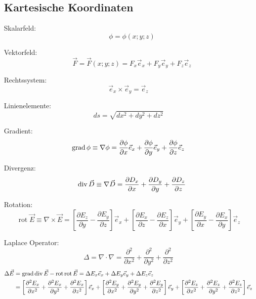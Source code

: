 \subsection{Kartesische Koordinaten}
\begin{description}
      \item Skalarfeld:
            \[
                  \quad \phi = \phi(x;y;z)
            \]
      \item Vektorfeld:
            \[
                  \quad \vec{F} = \vec{F}(x;y;z) = F_x\vec{e}_x+F_y\vec{e}_y+F_z\vec{e}_z
            \]
      \item Rechtssystem:
            \[
                  \vec{e}_x \times \vec{e}_y=\vec{e}_z
            \]
      \item Linienelemente:
            \[
                  ds=\sqrt{d x^{2}+d y^{2}+d z^{2}}
            \]
      \item Gradient:
            \[
                  \operatorname{grad} \phi \equiv \nabla \phi=\frac{\partial \phi}{\partial x} \vec{e}_x+\frac{\partial \phi}{\partial y} \vec{e}_y+\frac{\partial \phi}{\partial z} \vec{e}_z
            \]
      \item Divergenz:
            \[
                  \quad \operatorname{div} \vec{D} \equiv \nabla \vec{D}=\frac{\partial D_{x}}{\partial x}+\frac{\partial D_{y}}{\partial y}+\frac{\partial D_{z}}{\partial z}
            \]
      \item Rotation:
            \[
                  \operatorname{rot} \vec{E} \equiv \nabla \times \vec{E} =
                  \left[\frac{\partial E_z}{\partial y}-\frac{\partial E_y}{\partial z}\right] \vec{e}_x+\left[\frac{\partial E_x}{\partial z}-\frac{\partial E_z}{\partial x}\right] \vec{e}_y+\left[\frac{\partial E_y}{\partial x}-\frac{\partial E_x}{\partial y}\right] \vec{e}_z
            \]
      \item Laplace Operator:
            \[
                  \Delta =\nabla\cdot\nabla =\frac{\partial^{2}}{\partial x^{2}}+\frac{\partial^{2}}{\partial y^{2}}+\frac{\partial^{2}}{\partial z^{2}}
            \]
            \begin{align*}
                  \Delta \vec{E} & = \operatorname{grad} \operatorname{div} \vec{E}-\operatorname{rot} \operatorname{rot} \vec{E} = \Delta E_x \vec{e}_x+\Delta E_y \vec{e}_y+\Delta E_z \vec{e}_z                                                                                                                                                                                                                                                                                                         \\
                                 & = \left[\frac{\partial^{2} E_x}{\partial x^{2}}+\frac{\partial^{2} E_x}{\partial y^{2}}+\frac{\partial^{2} E_x}{\partial z^{2}}\right] \vec{e}_x+\left[\frac{\partial^{2} E_y}{\partial x^{2}}+\frac{\partial^{2} E_y}{\partial y^{2}}+\frac{\partial^{2} E_y}{\partial z^{2}}\right] \vec{e}_y+ \left[\frac{\partial^{2} E_z}{\partial x^{2}}+\frac{\partial^{2} E_z}{\partial y^{2}}+\frac{\partial^{2} E_z}{\partial z^{2}}\right] \vec{e}_z
            \end{align*}
\end{description}

